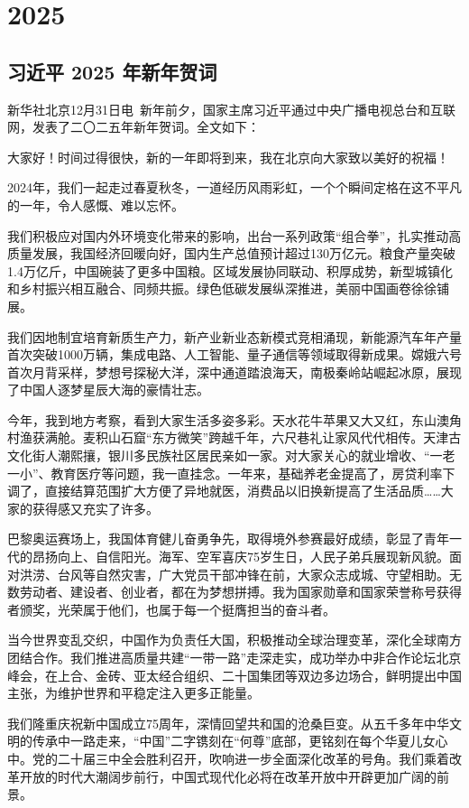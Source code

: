 \chapter{2025}

\section{习近平 2025 年新年贺词}
新华社北京12月31日电 新年前夕，国家主席习近平通过中央广播电视总台和互联网，发表了二〇二五年新年贺词。全文如下：

大家好！时间过得很快，新的一年即将到来，我在北京向大家致以美好的祝福！

2024年，我们一起走过春夏秋冬，一道经历风雨彩虹，一个个瞬间定格在这不平凡的一年，令人感慨、难以忘怀。

我们积极应对国内外环境变化带来的影响，出台一系列政策“组合拳”，扎实推动高质量发展，我国经济回暖向好，国内生产总值预计超过130万亿元。粮食产量突破1.4万亿斤，中国碗装了更多中国粮。区域发展协同联动、积厚成势，新型城镇化和乡村振兴相互融合、同频共振。绿色低碳发展纵深推进，美丽中国画卷徐徐铺展。

我们因地制宜培育新质生产力，新产业新业态新模式竞相涌现，新能源汽车年产量首次突破1000万辆，集成电路、人工智能、量子通信等领域取得新成果。嫦娥六号首次月背采样，梦想号探秘大洋，深中通道踏浪海天，南极秦岭站崛起冰原，展现了中国人逐梦星辰大海的豪情壮志。

今年，我到地方考察，看到大家生活多姿多彩。天水花牛苹果又大又红，东山澳角村渔获满舱。麦积山石窟“东方微笑”跨越千年，六尺巷礼让家风代代相传。天津古文化街人潮熙攘，银川多民族社区居民亲如一家。对大家关心的就业增收、“一老一小”、教育医疗等问题，我一直挂念。一年来，基础养老金提高了，房贷利率下调了，直接结算范围扩大方便了异地就医，消费品以旧换新提高了生活品质……大家的获得感又充实了许多。

巴黎奥运赛场上，我国体育健儿奋勇争先，取得境外参赛最好成绩，彰显了青年一代的昂扬向上、自信阳光。海军、空军喜庆75岁生日，人民子弟兵展现新风貌。面对洪涝、台风等自然灾害，广大党员干部冲锋在前，大家众志成城、守望相助。无数劳动者、建设者、创业者，都在为梦想拼搏。我为国家勋章和国家荣誉称号获得者颁奖，光荣属于他们，也属于每一个挺膺担当的奋斗者。

当今世界变乱交织，中国作为负责任大国，积极推动全球治理变革，深化全球南方团结合作。我们推进高质量共建“一带一路”走深走实，成功举办中非合作论坛北京峰会，在上合、金砖、亚太经合组织、二十国集团等双边多边场合，鲜明提出中国主张，为维护世界和平稳定注入更多正能量。

我们隆重庆祝新中国成立75周年，深情回望共和国的沧桑巨变。从五千多年中华文明的传承中一路走来，“中国”二字镌刻在“何尊”底部，更铭刻在每个华夏儿女心中。党的二十届三中全会胜利召开，吹响进一步全面深化改革的号角。我们乘着改革开放的时代大潮阔步前行，中国式现代化必将在改革开放中开辟更加广阔的前景。

